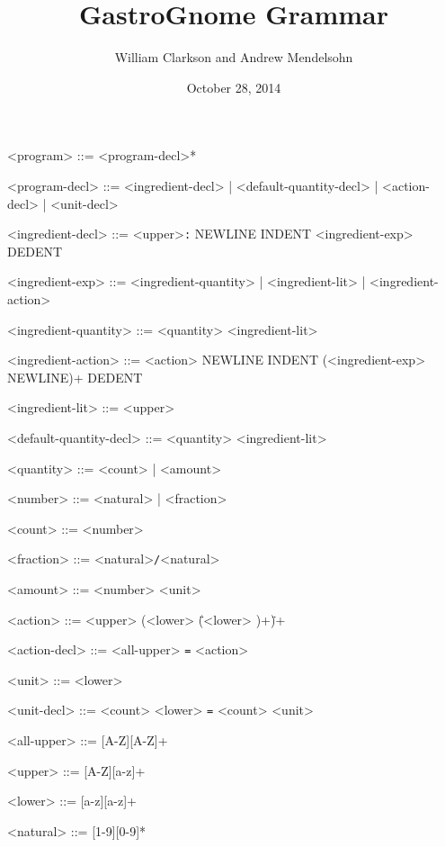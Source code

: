 \documentclass{article}
\title{ GastroGnome Grammar}
\author{William Clarkson and Andrew Mendelsohn}
\date{October 28, 2014}
\begin{document}
\maketitle
\thispagestyle{empty}

\begin{grammar}
<program>         ::= <program-decl>*

<program-decl>    ::= <ingredient-decl>
				  | <default-quantity-decl>
				  | <action-decl>
				  | <unit-decl>

<ingredient-decl> ::= <upper>\texttt{:} NEWLINE INDENT <ingredient-exp> DEDENT

<ingredient-exp> ::= <ingredient-quantity> | <ingredient-lit> | <ingredient-action>

<ingredient-quantity> ::= <quantity> <ingredient-lit>

<ingredient-action> ::= <action> NEWLINE INDENT (<ingredient-exp> NEWLINE)+ DEDENT

<ingredient-lit> ::= <upper>  

<default-quantity-decl> ::= <quantity> <ingredient-lit>

<quantity> ::= <count> | <amount>

<number> ::= <natural> | <fraction>

<count> ::= <number>

<fraction> ::= <natural>\texttt{/}<natural>

<amount> ::= <number> <unit>

<action> ::= <upper> (<lower> \texttt{\"}(<lower> )+\texttt{\"})+

<action-decl> ::= <all-upper> \texttt{=} <action>

<unit> ::= <lower>

<unit-decl> ::= <count> <lower> \texttt{=} <count> <unit>

<all-upper> ::= [A-Z][A-Z]+

<upper> ::= [A-Z][a-z]+

<lower> ::= [a-z][a-z]+

<natural> ::= [1-9][0-9]*

\end{grammar}
\end{document}
